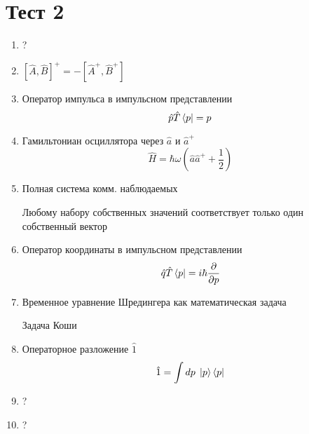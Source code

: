 \section*{Тест 2}
\begin{enumerate}
    \item ?
    \item $[\hat A,\hat B]^+=-[\hat A^+,\hat B^+]$
    \item Оператор импульса в импульсном представлении
        $$\hat p \hat T\bra{p}=p$$
    \item Гамильтониан осциллятора через $\hat a$ и $\hat a^+$
        $$\hat H=\hbar\omega(\hat a\hat a^++\frac{1}{2})$$
    \item Полная система комм. наблюдаемых

        Любому набору собственных значений соответствует только один 
        собственный вектор
    \item Оператор координаты в импульсном представлении
        $$\hat q\hat T\bra{p}=i\hbar\frac{\partial}{\partial p}$$
    \item Временное уравнение Шредингера как математическая задача

        Задача Коши
    \item Операторное разложение $\hat 1$
        $$\hat 1=\int dp\;\ket{p}\bra{p}$$
    \item ?
    \item ?
\end{enumerate}
